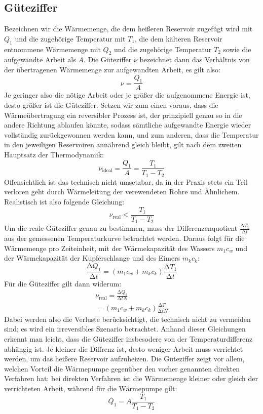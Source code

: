 \subsection{Güteziffer}
Bezeichnen wir die Wärmemenge, die dem heißeren Reservoir zugefügt wird mit $Q_{1}$ und die zugehörige Temperatur mit $T_{1}$, die dem kälteren Reservoir entnommene 
Wärmemenge mit $Q_{2}$ und die zugehörige Temperatur $T_{2}$ sowie die aufgewandte Arbeit als $A$.
Die Güteziffer $\nu$ bezeichnet dann das Verhältnis von der übertragenen Wärmemenge zur aufgewandten Arbeit, es gilt also:
\begin{equation}
\nu = \frac{Q_{1}}{A}
\end{equation}
Je geringer also die nötige Arbeit oder je größer die aufgenommene Energie ist, desto größer ist die Güteziffer. 
Setzen wir zum einen voraus, dass die Wärmeübertragung ein reversibler Prozess ist, der prinzipiell genau so in die andere Richtung ablaufen könnte, sodass sämtliche
aufgewandte Energie wieder vollständig zurückgewonnen werden kann, und zum anderen, dass die Temperatur in den jeweiligen Reservoiren annährend gleich bleibt, gilt
nach dem zweiten Hauptsatz der Thermodynamik:
\begin{equation}
\nu_\text{ideal} = \frac{Q_1}{A} = \frac{T_1}{T_{1}-T_{2}}
\end{equation}
Offensichtlich ist das technisch nicht umsetzbar, da in der Praxis stets ein Teil verloren geht durch Wärmeleitung der verewendeten Rohre und Ähnlichem. Realistisch
ist also folgende Gleichung:
\begin{equation}
\nu_\text{real} < \frac{T_1}{T_{1}-T_{2}}
\end{equation}
Um die reale Güteziffer genau zu bestimmen, muss der Differenzenquotient $\frac{\increment T_1}{\increment t}$ aus der gemessenen Temperaturkurve betrachtet werden.
Daraus folgt für die Wärmemenge pro Zeiteinheit, mit der Wärmekapazität des Wassers $m_1 c_w$ und der Wärmekapazität der Kupferschlange und des 
Eimers $m_k c_k$:
\begin{equation}
\frac{\increment Q_1}{\increment t} = \left( m_1 c_w + m_k c_k \right) \frac{\increment T_1}{\increment t}
\end{equation}
Für die Güteziffer gilt dann widerum:
\begin{align}
\nu_\text{real} = \frac{\increment Q_1}{\increment t N}\\
= \left( m_1 c_w + m_k c_k \right) \frac{\increment T_1}{\increment t N}
\end{align}
Dabei werden also die Verluste berücksichtigt, die technisch nicht zu vermeiden sind; es wird ein irreversibles Szenario betrachtet.
Anhand dieser Gleichungen erkennt man leicht, dass die Güteziffer insbesodere von der Temperaturdifferenz abhängig ist. Je kleiner die Diffrenz ist, desto
weniger Arbeit muss verrichtet werden, um das heißere Reservoir aufzuheizen.
Die Güteziffer zeigt vor allem, welchen Vorteil die Wärmepumpe gegenüber den vorher genannten direkten Verfahren hat: bei direkten Verfahren ist die Wärmemenge
kleiner oder gleich der verrichteten Arbeit, während für die Wärmepumpe gilt:
\begin{equation}
Q_1 = A \frac{T_1}{T_1 - T_2}
\end{equation}

